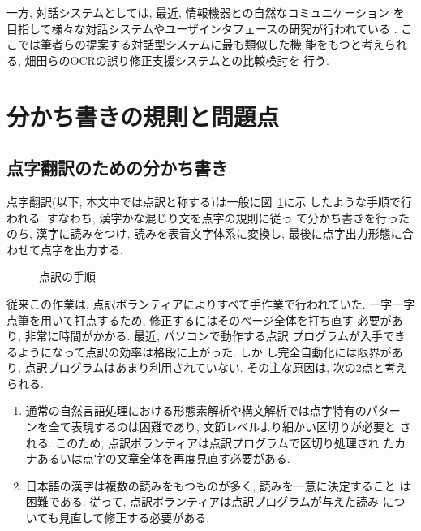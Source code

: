 一方, 対話システムとしては, 最近, 情報機器との自然なコミュニケーション
を目指して様々な対話システムやユーザインタフェースの研究が行われている
 \cite{hatada}. ここでは筆者らの提案する対話型システムに最も類似した機
能をもつと考えられる, 畑田らのOCRの誤り修正支援システムとの比較検討を
行う. 

\section{分かち書きの規則と問題点}
\subsection{点字翻訳のための分かち書き}
点字翻訳(以下, 本文中では点訳と称する)は一般に図~\ref{fig:a0}に示
したような手順で行われる. すなわち, 漢字かな混じり文を点字の規則に従っ
て分かち書きを行ったのち, 漢字に読みをつけ, 読みを表音文字体系に変換し, 
最後に点字出力形態に合わせて点字を出力する. 

\begin{figure}[t]
\begin{center}
\caption{点訳の手順}
\label{fig:a0}
\end{center}
\end{figure}

従来この作業は, 点訳ボランティアによりすべて手作業で行われていた. 
一字一字点筆を用いて打点するため, 修正するにはそのページ全体を打ち直す
必要があり, 非常に時間がかかる. 最近, パソコンで動作する点訳
プログラムが入手できるようになって点訳の効率は格段に上がった. しか
し完全自動化には限界があり, 点訳プログラムはあまり利用されていない. 
その主な原因は, 次の2点と考えられる. 

\vspace{0.3cm}

\begin{enumerate}
\item 通常の自然言語処理における形態素解析や構文解析では点字特有のパター
      ンを全て表現するのは困難であり, 文節レベルより細かい区切りが必要と
      される. このため, 点訳ボランティアは点訳プログラムで区切り処理され
      たカナあるいは点字の文章全体を再度見直す必要がある. 
\item 日本語の漢字は複数の読みをもつものが多く, 読みを一意に決定すること
      は困難である. 従って, 点訳ボランティアは点訳プログラムが与えた読み
      についても見直して修正する必要がある. 
\end{enumerate}

\vspace{0.3cm}

